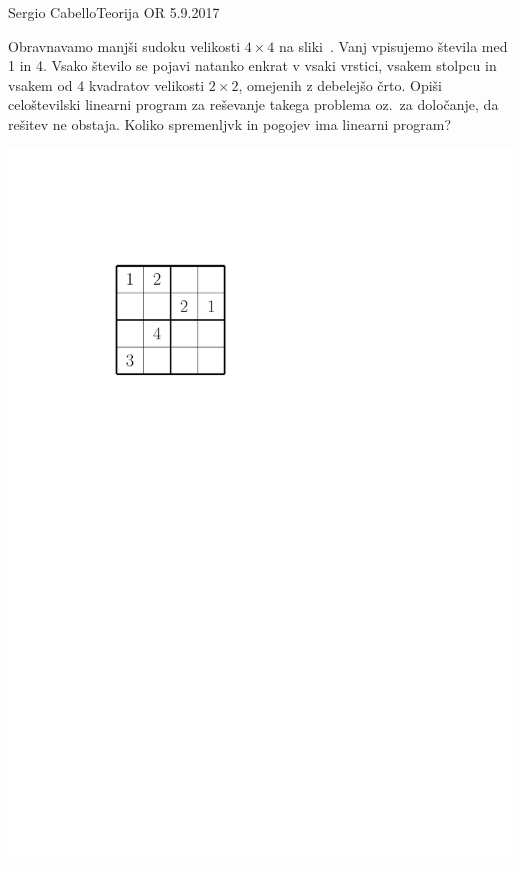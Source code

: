 \begin{naloga}{Sergio Cabello}{Teorija OR 5.9.2017}
\begin{vprasanje}[sudoku]
Obravnavamo manjši sudoku velikosti $4\times 4$ na sliki~\fig{}.
Vanj vpisujemo števila med 1 in 4.
Vsako število se pojavi natanko enkrat v vsaki vrstici,
vsakem stolpcu in vsakem od $4$ kvadratov velikosti $2 \times 2$,
omejenih z debelejšo črto.
Opiši celoštevilski linearni program za reševanje takega problema
oz.~za določanje, da rešitev ne obstaja.
Koliko spremenljvk in pogojev ima linearni program?

\begin{slika}
\includegraphics[scale=.7]{slike/sudoku}
\end{slika}
\end{vprasanje}
\begin{odgovor}
\end{odgovor}
\end{naloga}
